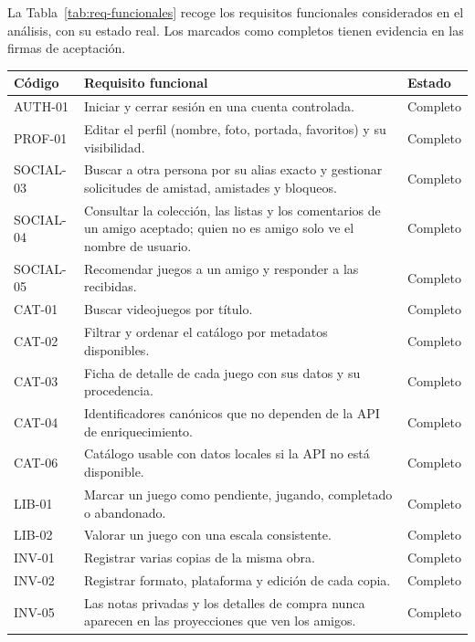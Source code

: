 La Tabla~\ref{tab:req-funcionales} recoge los requisitos funcionales considerados en el
análisis, con su estado real. Los marcados como completos tienen evidencia en las firmas de
aceptación.

\begin{table}[htp]
\centering
\tablecompact
\begin{tabularx}{\textwidth}{ | L{0.18\textwidth} | Y | C{0.22\textwidth} | }
    \hline
    \textbf{Código} & \textbf{Requisito funcional} & \textbf{Estado} \\
    \hline
    AUTH-01 & Iniciar y cerrar sesión en una cuenta controlada. & Completo \\
    \hline
    PROF-01 & Editar el perfil (nombre, foto, portada, favoritos) y su visibilidad. & Completo \\
    \hline
    SOCIAL-03 & Buscar a otra persona por su alias exacto y gestionar solicitudes de amistad, amistades y bloqueos. & Completo \\
    \hline
    SOCIAL-04 & Consultar la colección, las listas y los comentarios de un amigo aceptado; quien no es amigo solo ve el nombre de usuario. & Completo \\
    \hline
    SOCIAL-05 & Recomendar juegos a un amigo y responder a las recibidas. & Completo \\
    \hline
    CAT-01 & Buscar videojuegos por título. & Completo \\
    \hline
    CAT-02 & Filtrar y ordenar el catálogo por metadatos disponibles. & Completo \\
    \hline
    CAT-03 & Ficha de detalle de cada juego con sus datos y su procedencia. & Completo \\
    \hline
    CAT-04 & Identificadores canónicos que no dependen de la API de enriquecimiento. & Completo \\
    \hline
    CAT-06 & Catálogo usable con datos locales si la API no está disponible. & Completo \\
    \hline
    LIB-01 & Marcar un juego como pendiente, jugando, completado o abandonado. & Completo \\
    \hline
    LIB-02 & Valorar un juego con una escala consistente. & Completo \\
    \hline
    INV-01 & Registrar varias copias de la misma obra. & Completo \\
    \hline
    INV-02 & Registrar formato, plataforma y edición de cada copia. & Completo \\
    \hline
    INV-05 & Las notas privadas y los detalles de compra nunca aparecen en las proyecciones que ven los amigos. & Completo \\

\end{tabularx}
\end{table}

